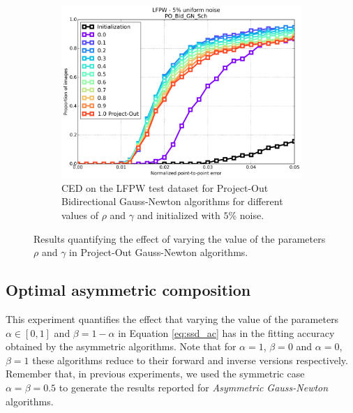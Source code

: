 \begin{figure}[p]
	\begin{subfigure}{0.48\textwidth}
	    \includegraphics[width=\textwidth]{experiments/rho/ced_po_bid_gn_5.png}
	    \caption{CED on the LFPW test dataset for Project-Out Bidirectional Gauss-Newton algorithms for different values of $\rho$ and $\gamma$ and initialized with $5\%$ noise.}
	    \label{fig:ced_po_bid_gn}
	\end{subfigure}
	\caption{Results quantifying the effect of varying the value of the parameters $\rho$ and $\gamma$ in Project-Out Gauss-Newton algorithms.}
	\label{fig:rho}
\end{figure}



\subsection{Optimal asymmetric composition}

This experiment quantifies the effect that varying the value of the parameters $\alpha \in [0, 1]$ and $\beta = 1 -\alpha$ in Equation \ref{eq:ssd_ac} has in the fitting accuracy obtained by the asymmetric algorithms. Note that for $\alpha=1$, $\beta=0$ and $\alpha=0$, $\beta=1$ these algorithms reduce to their forward and inverse versions respectively. Remember that, in previous experiments, we used the symmetric case $\alpha=\beta=0.5$ to generate the results reported for \emph{Asymmetric Gauss-Newton} algorithms.

